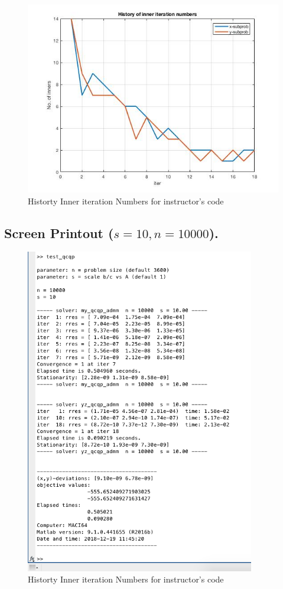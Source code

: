 \begin{figure}[H]
\centering
\includegraphics[width=12cm]{F_6/F_1_4.jpg}
\caption{Historty Inner iteration Numbers for instructor's code}
\end{figure}
\subsection{Screen Printout ($s=10,n=10000$).}
\begin{figure}[H]
\centering
\includegraphics[width=10cm]{F_6/F_1_1.png}
\caption{Historty Inner iteration Numbers for instructor's code}
\end{figure}


